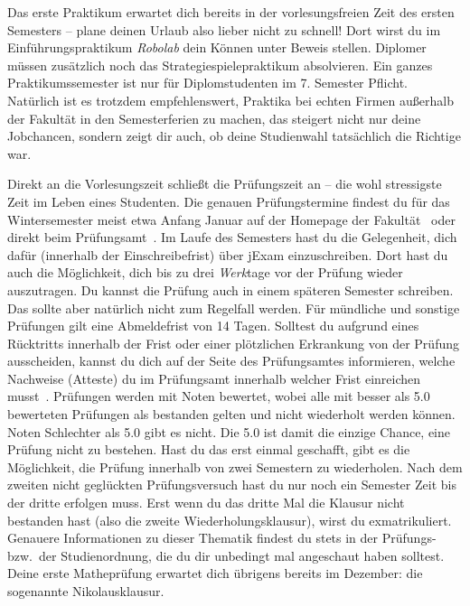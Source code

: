 
Das erste Praktikum erwartet dich bereits in der vorlesungsfreien Zeit des ersten Semesters -- plane deinen Urlaub also lieber nicht zu schnell!
Dort wirst du im Einführungspraktikum \textit{Robolab} dein Können unter Beweis stellen. Diplomer müssen zusätzlich noch das Strategiespielepraktikum absolvieren.
Ein ganzes Praktikumssemester ist nur für Diplomstudenten im 7. Semester Pflicht.
Natürlich ist es trotzdem empfehlenswert, Praktika bei echten Firmen außerhalb der Fakultät in den Semesterferien zu machen, das steigert nicht nur deine Jobchancen,
sondern zeigt dir auch, ob deine Studienwahl tatsächlich die Richtige war.

\label{sec:pruefungen}
Direkt an die Vorlesungszeit schließt die Prüfungszeit an – die wohl stressigste Zeit im Leben eines Studenten.
Die genauen Prüfungstermine findest du für das Wintersemester meist etwa Anfang Januar auf der Homepage der Fakultät~ oder direkt beim Prüfungsamt~.
Im Laufe des Semesters hast du die Gelegenheit, dich dafür (innerhalb der Einschreibefrist) über jExam einzuschreiben.
Dort hast du auch die Möglichkeit, dich bis zu drei \emph{Werk}tage vor der Prüfung wieder auszutragen. Du kannst die Prüfung auch in einem späteren Semester schreiben. Das sollte aber natürlich nicht zum Regelfall werden. Für mündliche und sonstige Prüfungen gilt eine Abmeldefrist von 14 Tagen.
Solltest du aufgrund eines Rücktritts innerhalb der Frist oder einer plötzlichen Erkrankung von der Prüfung ausscheiden, kannst du dich auf der Seite des Prüfungsamtes informieren,
welche Nachweise (Atteste) du im Prüfungsamt innerhalb welcher Frist einreichen musst~.
Prüfungen werden mit Noten bewertet, wobei alle mit besser als 5.0 bewerteten Prüfungen als bestanden gelten und nicht wiederholt werden können.
Noten Schlechter als 5.0 gibt es nicht.
Die 5.0 ist damit die einzige Chance, eine Prüfung nicht zu bestehen.
Hast du das erst einmal geschafft, gibt es die Möglichkeit, die Prüfung innerhalb von zwei Semestern zu wiederholen.
Nach dem zweiten nicht geglückten Prüfungsversuch hast du nur noch ein Semester Zeit bis der dritte erfolgen muss.
Erst wenn du das dritte Mal die Klausur nicht bestanden hast (also die zweite Wiederholungsklausur), wirst du exmatrikuliert.
Genauere Informationen zu dieser Thematik findest du stets in der Prüfungs- bzw.\ der Studienordnung, die du dir unbedingt mal angeschaut haben solltest.
Deine erste Matheprüfung erwartet dich übrigens bereits im Dezember: die sogenannte Nikolausklausur.

